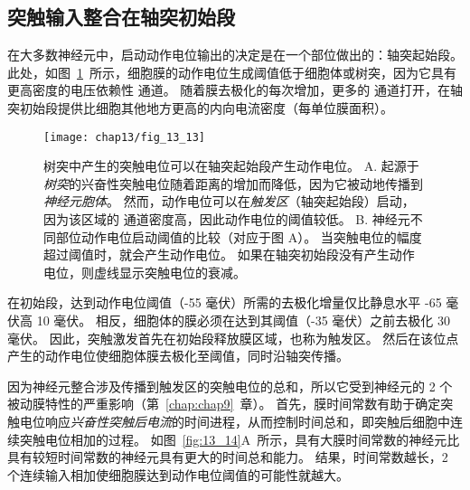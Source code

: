 \subsection{突触输入整合在轴突初始段}

在大多数神经元中，启动动作电位输出的决定是在一个部位做出的：轴突起始段。
此处，如图~\ref{fig:13_13}~所示，细胞膜的动作电位生成阈值低于细胞体或树突，因为它具有更高密度的电压依赖性  通道。
随着膜去极化的每次增加，更多的  通道打开，在轴突初始段提供比细胞其他地方更高的内向电流密度（每单位膜面积）。


\begin{figure}[htbp]
	\centering
	\texttt{[image: chap13/fig\_13\_13]}
	\caption{树突中产生的突触电位可以在轴突起始段产生动作电位\cite{eckert1988propagation}。
		A. 起源于\textit{树突}的兴奋性突触电位随着距离的增加而降低，因为它被动地传播到\textit{神经元胞体}。
		然而，动作电位可以在\textit{触发区}（轴突起始段）启动，因为该区域的  通道密度高，因此动作电位的阈值较低。
		B. 神经元不同部位动作电位启动阈值的比较（对应于图 A）。
		当突触电位的幅度超过阈值时，就会产生动作电位。
		如果在轴突初始段没有产生动作电位，则虚线显示突触电位的衰减。}
	\label{fig:13_13}
\end{figure}


在初始段，达到动作电位阈值（-55 毫伏）所需的去极化增量仅比静息水平 -65 毫伏高 10 毫伏。
相反，细胞体的膜必须在达到其阈值（-35 毫伏）之前去极化 30 毫伏。
因此，突触激发首先在初始段释放膜区域，也称为触发区。
然后在该位点产生的动作电位使细胞体膜去极化至阈值，同时沿轴突传播。


因为神经元整合涉及传播到触发区的突触电位的总和，所以它受到神经元的 2 个被动膜特性的严重影响（第~\ref{chap:chap9}~章）。
首先，膜时间常数有助于确定突触电位响应\textit{兴奋性突触后电流}的时间进程，从而控制时间总和，即突触后细胞中连续突触电位相加的过程。
如图~\ref{fig:13_14}A~所示，具有大膜时间常数的神经元比具有较短时间常数的神经元具有更大的时间总和能力。
结果，时间常数越长，2 个连续输入相加使细胞膜达到动作电位阈值的可能性就越大。


